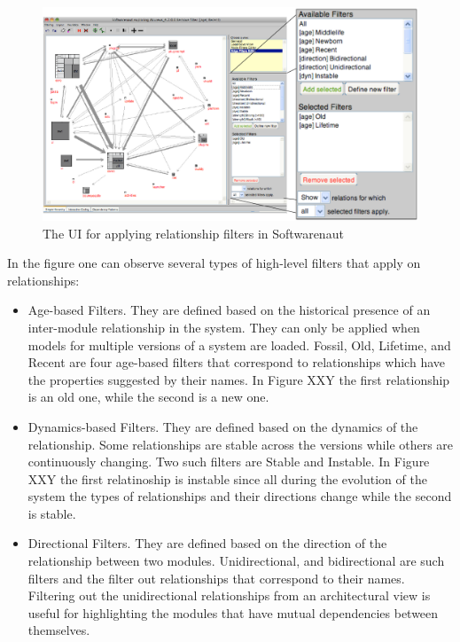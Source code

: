 \documentclass[preprint,12pt]{elsarticle}
\begin{document}
\begin{figure}[h]
\begin{center}
\includegraphics[width=\linewidth]{images/SnautFilteringPanel}
\caption{The UI for applying relationship filters in Softwarenaut}
\label{}
\end{center}
\end{figure}

In the figure one can observe several types of high-level filters that apply on relationships: 

\begin{itemize}
\item Age-based Filters. They are defined based on the historical presence of an inter-module relationship in the system. They can only be applied when models for multiple versions of a system are loaded. Fossil, Old, Lifetime, and Recent are four age-based filters that correspond to relationships which have the properties suggested by their names. In Figure XXY the first relationship is an old one, while the second is a new one. 

\item Dynamics-based Filters. They are defined based on the dynamics of the relationship. Some relationships are stable across the versions while others are continuously changing. Two such filters are Stable and Instable. In Figure XXY the first relatinoship is instable since all during the evolution of the system the types of relationships and their directions change while the second is stable.

\item Directional Filters. They are defined based on the direction of the relationship between two modules. Unidirectional, and bidirectional are such filters and the filter out relationships that correspond to their names. Filtering out the unidirectional relationships from an architectural view is useful for highlighting the modules that have mutual dependencies between themselves. 
\end{itemize}
\end{document}
